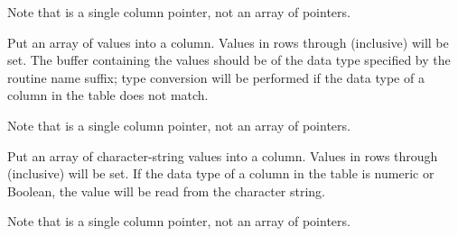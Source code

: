 \callseqtable

Note that  is a single column pointer,
not an array of pointers.

\begin{callseq}
\end{callseq}

Put an array of values into a column.  Values in rows 
through  (inclusive) will be set.
The buffer containing the values should be of
the data type specified by the routine name suffix; type conversion will be
performed if the data type of a column in the table does not match.

\callseqtable

Note that  is a single column pointer,
not an array of pointers.

\begin{callseq}
\end{callseq}

Put an array of character-string values into a column.
Values in rows 
through  (inclusive) will be set.
If the data type of a column in the table is numeric or Boolean, the
value will be read from the character string.

\callseqtable

Note that  is a single column pointer,
not an array of pointers.

\begin{callseq}
\end{callseq}

